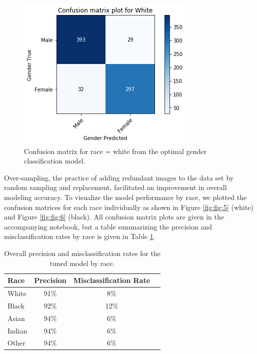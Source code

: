 \documentclass[obeyspaces, spaces, fleqn,10pt]{SelfArx} %
\begin{document}
\begin{figure}[ht]\centering %
\includegraphics[width=.95\linewidth]{img/confmat_white}
\caption{Confusion matrix for race = white from the optimal gender classification model.}
\label{fig:fig5}
\end{figure}

Over-sampling, the practice of adding redundant images to the data set by random sampling and replacement, facilitated an improvement in overall modeling accuracy. To visualize the model performance by race, we plotted the confusion matrices for each race individually as shown in Figure \ref{fig:fig:5} (white) and Figure \ref{fig:fig:6} (black). All confusion matrix plots are given in the accompanying notebook, but a table summarizing the precision and misclassification rates by race is given in Table \ref{tab:tab4}. 

\begin{table}[hbt]
\caption{Overall precision and misclassification rates for the tuned model by race.}
\centering
\begin{tabular}{lccc}
\toprule
Race & Precision & Misclassification Rate \\
\midrule
White & 91\% & 8\% \\
Black & 92\% & 12\% \\
Asian & 94\% & 6\% \\
Indian & 94\% & 6\% \\
Other & 94\% & 6\% \\
\bottomrule
\end{tabular}
\label{tab:tab4}
\end{table}
\end{document}
